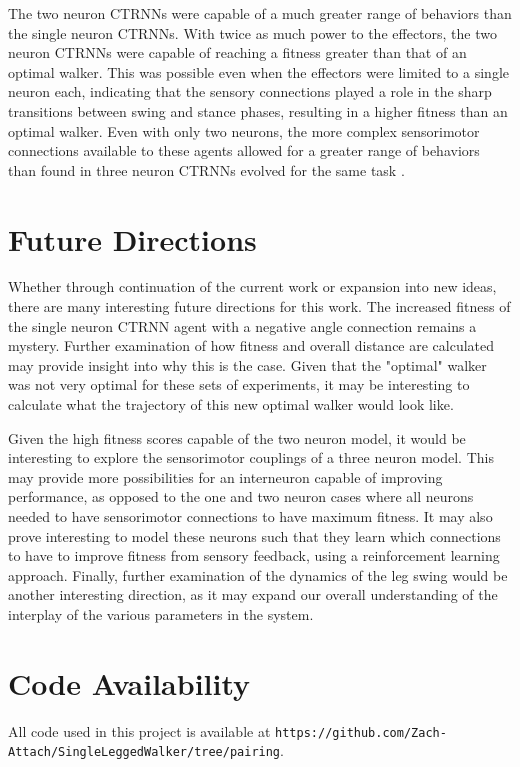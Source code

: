 \documentclass{article}
\begin{document}
The two neuron CTRNNs were capable of a much greater range of behaviors than the single neuron CTRNNs. With twice as much power to the effectors, the two neuron CTRNNs were capable of reaching a fitness greater than that of an optimal walker. This was possible even when the effectors were limited to a single neuron each, indicating that the sensory connections played a role in the sharp transitions between swing and stance phases, resulting in a higher fitness than an optimal walker. Even with only two neurons, the more complex sensorimotor connections available to these agents allowed for a greater range of behaviors than found in three neuron CTRNNs evolved for the same task \cite{BeerWalker}.

\section{Future Directions}
Whether through continuation of the current work or expansion into new ideas, there are many interesting future directions for this work. The increased fitness of the single neuron CTRNN agent with a negative angle connection remains a mystery. Further examination of how fitness and overall distance are calculated may provide insight into why this is the case. Given that the "optimal" walker was not very optimal for these sets of experiments, it may be interesting to calculate what the trajectory of this new optimal walker would look like.

Given the high fitness scores capable of the two neuron model, it would be interesting to explore the sensorimotor couplings of a three neuron model. This may provide more possibilities for an interneuron capable of improving performance, as opposed to the one and two neuron cases where all neurons needed to have sensorimotor connections to have maximum fitness. It may also prove interesting to model these neurons such that they learn which connections to have to improve fitness from sensory feedback, using a reinforcement learning approach. Finally, further examination of the dynamics of the leg swing would be another interesting direction, as it may expand our overall understanding of the interplay of the various parameters in the system.



\section{Code Availability}
All code used in this project is available at \texttt{https://github.com/Zach-Attach/SingleLeggedWalker/tree/pairing}.

\pagebreak


\end{document}
